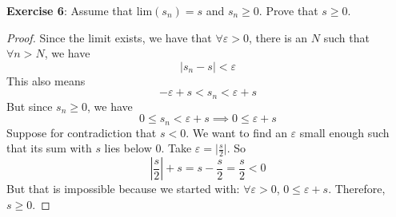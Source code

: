 \documentclass{article}
\begin{document}
\textbf{Exercise 6}: Assume that $\text{lim}(s_{n}) = s$ and $s_{n} \geq 0$. Prove that $s \geq 0$.
    \begin{proof}
        Since the limit exists, we have that $\forall \varepsilon > 0$, there is an $N$ such that $\forall n > N$, we have
            \begin{equation*}
                \lvert s_{n} - s \rvert < \varepsilon
            \end{equation*}
        This also means
            \begin{equation*}
                -\varepsilon + s < s_{n} < \varepsilon + s
            \end{equation*}
        But since $s_{n} \geq 0$, we have
            \begin{equation*}
                0 \leq s_{n} < \varepsilon + s \implies 0 \leq \varepsilon + s
            \end{equation*}
        Suppose for contradiction that $s < 0$. We want to find an $\varepsilon$ small enough such that its sum with $s$ lies below $0$. Take $\varepsilon = \lvert \frac{s}{2} \rvert$. So
            \begin{equation*}
                \left\lvert \dfrac{s}{2} \right\rvert + s = s - \dfrac{s}{2} = \dfrac{s}{2} < 0
            \end{equation*}
        But that is impossible because we started with: $\forall \varepsilon > 0$, $0 \leq \varepsilon + s$. Therefore, $s \geq 0$.
    \end{proof}
\end{document}
